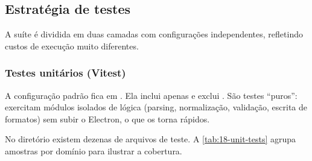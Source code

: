 \subsection{Estratégia de testes}
\label{sub:18-testes}

A suíte é dividida em duas camadas com configurações independentes, refletindo
custos de execução muito diferentes.

\subsubsection{Testes unitários (Vitest)}

A configuração padrão fica em . Ela inclui apenas
 e exclui . São testes
\enquote{puros}: exercitam módulos isolados de lógica (parsing, normalização,
validação, escrita de formatos) sem subir o Electron, o que os torna rápidos.

No diretório  existem dezenas de arquivos de teste. A
\autoref{tab:18-unit-tests} agrupa amostras por domínio para ilustrar a
cobertura.


